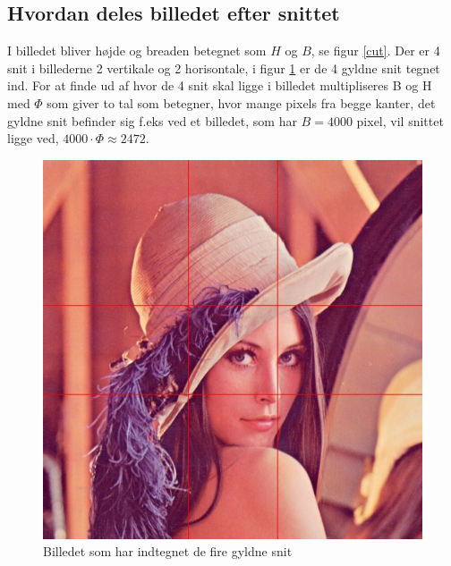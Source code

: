 \subsection{Hvordan deles billedet efter snittet}
I billedet bliver højde og breaden betegnet som $H$ og $B$, se figur
\ref{cut}. Der er 4 snit i billederne 2 vertikale og 2 horisontale, i
figur \ref{lenasnit2} er de 4 gyldne snit tegnet ind. For at finde ud af hvor
de 4 snit skal ligge i billedet multipliseres B og H med $\varPhi$ som
giver to tal som betegner, hvor mange pixels fra begge kanter, det
gyldne snit befinder sig f.eks ved et billedet, som har $B = 4000$ pixel,
vil snittet ligge ved, $4000 \cdot \varPhi \approx 2472$.

\begin{figure}[h]
	\begin{center}
		\includegraphics[scale=0.42,angle=0]{afsnit/vores_implementation/billeder/naiv_algoritme/Lenagolden}
	\end{center}
	\caption[]{Billedet som har indtegnet de fire gyldne snit}
	\label{lenasnit2}
\end{figure}

